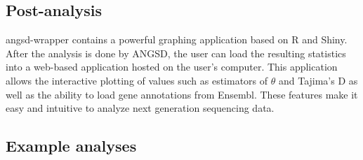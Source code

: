 \documentclass[12pt]{article}
\begin{document}
\subsection*{Post-analysis}
angsd-wrapper contains a powerful graphing application based on R and Shiny. %
After the analysis is done by ANGSD,  the user can load the resulting statistics into a web-based application hosted on the user's computer. 
This application allows the interactive plotting of values such as estimators of $\theta$ and Tajima's D as well as the ability to load gene annotations from Ensembl. 
These features make it easy and intuitive to analyze next generation sequencing data.

\subsection*{Example analyses}
\end{document}
